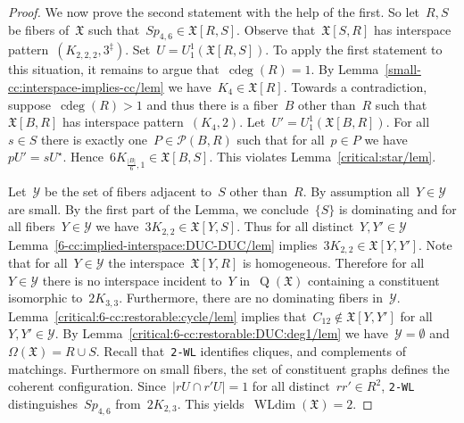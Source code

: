 \documentclass[english,a4paper]{article}
\theoremstyle{plain}
\theoremstyle{definition}
\newcommand{\abs}[1]{| #1 |}
\newcommand{\coherentConfig}{\ensuremath{\mathfrak{X}}}
\newcommand{\interspace}[2]{\ensuremath{\coherentConfig[#1,#2]}}
\newcommand{\inducedCC}[1]{\ensuremath{\coherentConfig[#1]}}
\newcommand{\vertices}{\ensuremath{\Omega}}
\DeclareMathOperator*{\WLdim}{WLdim}
\newcommand{\wldim}[1]{\ensuremath{\WLdim\left(#1\right)}}
\newcommand{\wld}[1]{\texttt{#1-WL}}
\newcommand{\wltwo}{\wld{2}\xspace}
\DeclareMathOperator*{\Quotient}{Q}
\newcommand{\quotientGraph}[1]{\ensuremath{\Quotient(#1)}}
\DeclareMathOperator{\ColorDeg}{cdeg}
\newcommand{\colorDeg}[1]{\ensuremath{\ColorDeg\left(#1\right)}}
\newcommand{\equivalenceClasses}[1]{\ensuremath{\mathcal{P}(#1)}}
\newcommand{\ipfourClique}  {\ensuremath{(\clique{4},2)}}
\newcommand{\ipsixMatchingComplementD}{\ensuremath{(\clique{2,2,2},3^\ddag)}}
\newcommand{\clique}[1]{\ensuremath{K_{#1}}}
\newcommand{\cycle}[1]{\ensuremath{C_{#1}}}
\newcommand{\disjointCliques}[2]{\ensuremath{#1 \clique{#2}}}
\newcommand{\interspaceFourSix}{\ensuremath{Sp_{4,6}}}
\begin{document}
\begin{proof}
We now prove the second statement with the help of the first.
    So let~$R,S$ be fibers of~$\coherentConfig$ such that~$\interspaceFourSix \in \interspace{R}{S}$.
    Observe that~$\interspace{S}{R}$ has interspace pattern~$\ipsixMatchingComplementD$.
    Set~$U = U^1_1(\interspace{R}{S})$.
    To apply the first statement to this situation, it remains to argue that~$\colorDeg{R} = 1$.
    By Lemma~\ref{small-cc:interspace-implies-cc/lem} we have~$\clique{4} \in \inducedCC{R}$.
    Towards a contradiction, suppose~$\colorDeg{R} > 1$ and thus there is a fiber~$B$ other than~$R$ such that~$\interspace{B}{R}$ has interspace pattern~$\ipfourClique$.
    Let~$U' = U^1_1(\interspace{B}{R})$.
    For all~$s \in S$ there is exactly one~$P \in \equivalenceClasses{B,R}$ such that for all~$p \in P$ we have~$pU' = sU^\star$.
    Hence~$\disjointCliques{6}{\frac{\abs{B}}{6},1} \in \interspace{B}{S}$.
    This violates Lemma~\ref{critical:star/lem}.

    Let~$\mathcal{Y}$ be the set of fibers adjacent to~$S$ other than~$R$.
    By assumption all~$Y \in \mathcal{Y}$ are small.
    By the first part of the Lemma, we conclude~$\{S\}$ is dominating and for all fibers~$Y \in \mathcal{Y}$ we have~$\disjointCliques{3}{2,2} \in \interspace{Y}{S}$.
    Thus for all distinct~$Y,Y' \in \mathcal{Y}$ Lemma~\ref{6-cc:implied-interspace:DUC-DUC/lem} implies~$\disjointCliques{3}{2,2} \in \interspace{Y}{Y'}$.
    Note that for all~$Y \in \mathcal{Y}$ the interspace~$\interspace{Y}{R}$ is homogeneous.
    Therefore for all~$Y \in \mathcal{Y}$ there is no interspace incident to~$Y$ in~$\quotientGraph{\coherentConfig}$ containing a constituent isomorphic to~$\disjointCliques{2}{3,3}$.
    Furthermore, there are no dominating fibers in~$\mathcal{Y}$.
    Lemma~\ref{critical:6-cc:restorable:cycle/lem} implies that~$\cycle{12} \notin \interspace{Y}{Y'}$ for all~$Y,Y' \in \mathcal{Y}$.
    By Lemma~\ref{critical:6-cc:restorable:DUC:deg1/lem} we have~$\mathcal{Y} = \emptyset$ and~$\vertices(\coherentConfig) = R \cup S$.
    Recall that~\wltwo identifies cliques, and complements of matchings.
    Furthermore on small fibers, the set of constituent graphs defines the coherent configuration.
    Since~$\abs{r U \cap r' U} = 1$ for all distinct~$rr' \in R^2$, \wltwo distinguishes~$\interspaceFourSix$ from~$\disjointCliques{2}{2,3}$.
    This yields~$\wldim{\coherentConfig} = 2$.
\end{proof}
\end{document}
